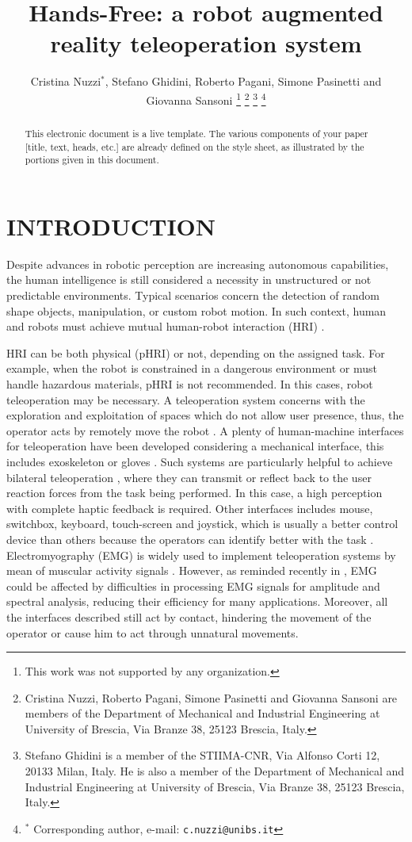 \documentclass[letterpaper, 10 pt, conference]{ieeeconf}  %
\title{\LARGE \bf
Hands-Free: a robot augmented reality teleoperation system
}
\author{Cristina Nuzzi$^{*}$, Stefano Ghidini, Roberto Pagani, Simone Pasinetti and Giovanna Sansoni %
\thanks{This work was not supported by any organization.}%
\thanks{Cristina Nuzzi, Roberto Pagani, Simone Pasinetti and Giovanna Sansoni are members of the Department of Mechanical and Industrial Engineering at University of Brescia, Via Branze 38, 25123 Brescia, Italy.}
\thanks{Stefano Ghidini is a member of the STIIMA-CNR, Via Alfonso Corti 12, 20133 Milan, Italy. He is also a member of the Department of Mechanical and Industrial Engineering at University of Brescia, Via Branze 38, 25123 Brescia, Italy.}
\thanks{$^{*}$ Corresponding author, e-mail: {\tt\small c.nuzzi@unibs.it}}%
}
\begin{document}
\maketitle
\thispagestyle{empty}
\pagestyle{empty}

\begin{abstract}

This electronic document is a live template. The various components of your paper [title, text, heads, etc.] are already defined on the style sheet, as illustrated by the portions given in this document.

\end{abstract}


\section{INTRODUCTION}
Despite advances in robotic perception are increasing autonomous capabilities, the human intelligence is still considered a necessity in unstructured or not predictable environments. Typical scenarios concern the detection of random shape objects, manipulation, or custom robot motion. In such context, human and robots must achieve mutual human-robot interaction (HRI) \cite{Yanco2002}.

HRI can be both physical (pHRI) or not, depending on the assigned task. For example, when the robot is constrained in a dangerous environment or must handle hazardous materials, pHRI is not recommended. In this cases, robot teleoperation may be necessary. A teleoperation system concerns with the exploration and exploitation of spaces which do not allow user presence, thus, the operator acts by remotely move the robot \cite{VERTUTJean}. A plenty of human-machine interfaces for teleoperation have been developed considering a mechanical interface, this includes exoskeleton \cite{Rebelo2014} or gloves \cite{Lv2006}. Such systems are particularly helpful to achieve bilateral teleoperation \cite{Hokayem2006}, where they can transmit or reflect back to the user reaction forces from the task being performed. In this case, a high perception with complete haptic feedback \cite{Glover2009} is required. Other interfaces includes mouse, switchbox, keyboard, touch-screen and joystick, which is usually a better control device than others because the operators can identify better with the task \cite{Boboc2012}. Electromyography (EMG) is widely used to implement teleoperation systems by mean of muscular activity signals \cite{Vogel2011, Hassan2019}. However, as reminded recently in \cite{Roveda2018a}, EMG could be affected by difficulties in processing EMG signals for amplitude and spectral analysis, reducing their efficiency for many applications. Moreover, all the interfaces described still act by contact, hindering the movement of the operator or cause him to act through unnatural movements.
\end{document}
